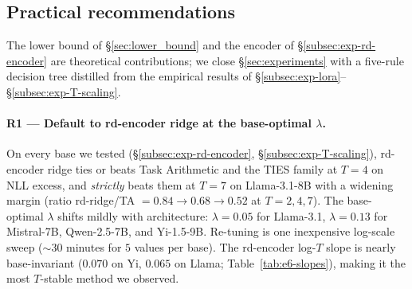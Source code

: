 
\subsection{Practical recommendations}
\label{sec:practical-recommendations}

The lower bound of \S\ref{sec:lower_bound} and the encoder of
\S\ref{subsec:exp-rd-encoder} are theoretical contributions; we close
\S\ref{sec:experiments} with a five-rule decision tree distilled from
the empirical results of \S\ref{subsec:exp-lora}--\S\ref{subsec:exp-T-scaling}.

\paragraph{R1 --- Default to rd-encoder ridge at the base-optimal
$\lambda$.}
On every base we tested (\S\ref{subsec:exp-rd-encoder}, \S\ref{subsec:exp-T-scaling}),
rd-encoder ridge ties or beats Task Arithmetic and the TIES family at
$T = 4$ on NLL excess, and \emph{strictly} beats them at $T = 7$ on
Llama-3.1-8B with a widening margin (ratio rd-ridge/TA $= 0.84 \to
0.68 \to 0.52$ at $T = 2, 4, 7$). The base-optimal $\lambda$ shifts
mildly with architecture: $\lambda = 0.05$ for Llama-3.1, $\lambda =
0.13$ for Mistral-7B, Qwen-2.5-7B, and Yi-1.5-9B. Re-tuning is one
inexpensive log-scale sweep ($\sim 30$ minutes for $5$ values per
base). The rd-encoder log-$T$ slope is nearly base-invariant
($0.070$ on Yi, $0.065$ on Llama; Table~\ref{tab:e6-slopes}), making
it the most $T$-stable method we observed.

